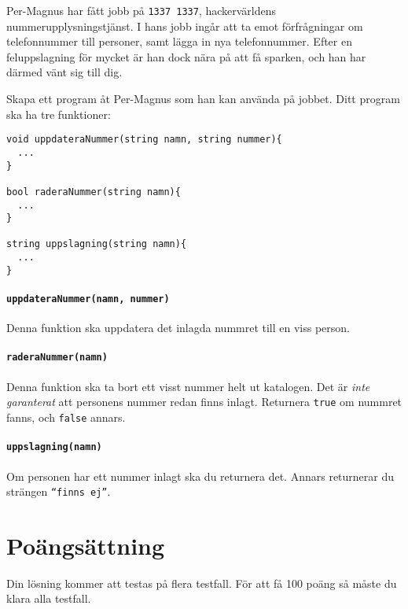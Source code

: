 
Per-Magnus har fått jobb på \texttt{1337 1337}, hackervärldens nummerupplysningstjänst. I hans jobb ingår att ta emot förfrågningar om telefonnummer till personer, samt lägga in nya telefonnummer. Efter en feluppslagning för mycket är han dock nära på att få sparken, och han har därmed vänt sig till dig.

Skapa ett program åt Per-Magnus som han kan använda på jobbet. Ditt program ska ha tre funktioner:

\begin{verbatim}
void uppdateraNummer(string namn, string nummer){
  ...
}

bool raderaNummer(string namn){
  ...
}

string uppslagning(string namn){
  ...
}
\end{verbatim}

\paragraph*{\texttt{uppdateraNummer(namn, nummer)}} Denna funktion ska uppdatera det inlagda nummret till en viss person.

\paragraph*{\texttt{raderaNummer(namn)}} Denna funktion ska ta bort ett visst nummer helt ut katalogen. Det är \emph{inte garanterat} att personens nummer redan finns inlagt. Returnera \texttt{true} om nummret fanns, och \texttt{false} annars.

\paragraph*{\texttt{uppslagning(namn)}}  Om personen har ett nummer inlagt ska du returnera det. Annars returnerar du strängen \texttt{``finns ej''}.

\section*{Poängsättning}
Din lösning kommer att testas på flera testfall. För att få 100 poäng så måste du klara alla testfall.
